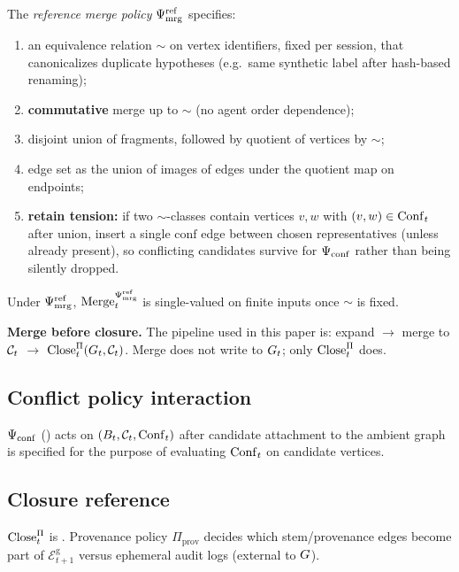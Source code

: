 \begin{definition}
\label{def:ref-merge}
The \emph{reference merge policy} $\Psi_{\mathrm{mrg}}^{\mathrm{ref}}$ specifies:
\begin{enumerate}[label=(\roman*),leftmargin=*]
  \item an equivalence relation $\sim$ on vertex identifiers, fixed per session, that canonicalizes duplicate hypotheses (e.g.\ same synthetic label after hash-based renaming);
  \item \textbf{commutative} merge up to $\sim$ (no agent order dependence);
  \item disjoint union of fragments, followed by quotient of vertices by $\sim$;
  \item edge set as the union of images of edges under the quotient map on endpoints;
  \item \textbf{retain tension:} if two $\sim$-classes contain vertices $v,w$ with $(v,w)\in\mathrm{Conf}_t$ after union, insert a single $\mathrm{conf}$ edge between chosen representatives (unless already present), so conflicting candidates survive for $\Psi_{\mathrm{conf}}$ rather than being silently dropped.
\end{enumerate}
Under $\Psi_{\mathrm{mrg}}^{\mathrm{ref}}$, $\mathrm{Merge}_t^{\Psi_{\mathrm{mrg}}^{\mathrm{ref}}}$ is single-valued on finite inputs once $\sim$ is fixed.
\end{definition}

\textbf{Merge before closure.} The pipeline used in this paper is: expand $\to$ merge to $\mathcal{C}_t$ $\to$ $\mathrm{Close}_t^{\Pi}(G_t,\mathcal{C}_t)$.
Merge does not write to $G_t$; only $\mathrm{Close}_t^{\Pi}$ does.

\subsection{Conflict policy interaction}
\label{sec:op-conflict}

$\Psi_{\mathrm{conf}}$ () acts on $(B_t,\mathcal{C}_t,\mathrm{Conf}_t)$ after candidate attachment to the ambient graph is specified for the purpose of evaluating $\mathrm{Conf}_t$ on candidate vertices.

\subsection{Closure reference}
\label{sec:op-close-repeat}

$\mathrm{Close}_t^{\Pi}$ is .
Provenance policy $\Pi_{\mathrm{prov}}$ decides which stem/provenance edges become part of $\mathcal{E}^{\mathrm{g}}_{t+1}$ versus ephemeral audit logs (external to $G$).


